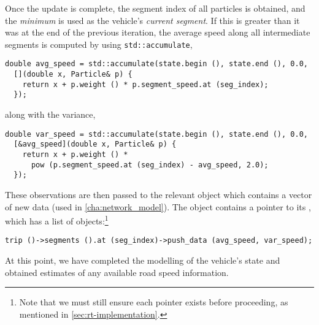 Once the update is complete, the segment index of all particles is obtained, and the \emph{minimum} is used as the vehicle's \emph{current segment}. If this is greater than it was at the end of the previous iteration, the average speed along all intermediate segments is computed by using \verb+std::accumulate+,
\begin{lstlisting}
double avg_speed = std::accumulate(state.begin (), state.end (), 0.0,
  [](double x, Particle& p) {
    return x + p.weight () * p.segment_speed.at (seg_index);
  });
\end{lstlisting}
along with the variance,
\begin{lstlisting}
double var_speed = std::accumulate(state.begin (), state.end (), 0.0,
  [&avg_speed](double x, Particle& p) {
    return x + p.weight () *
      pow (p.segment_speed.at (seg_index) - avg_speed, 2.0);
  });
\end{lstlisting}
These observations are then passed to the relevant  object which contains a vector of new data (used in \cref{cha:network_model}). The  object contains a pointer to its , which has a list of  objects:\footnote{Note that we must still ensure each pointer exists before proceeding, as mentioned in \cref{sec:rt-implementation}.}
\begin{lstlisting}
trip ()->segments ().at (seg_index)->push_data (avg_speed, var_speed);
\end{lstlisting}

At this point, we have completed the modelling of the vehicle's state and obtained estimates of any available road speed information.
